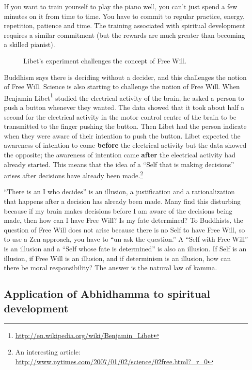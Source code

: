 If you want to train yourself to play the piano well, you can’t just spend a few minutes on it from time to time. You have to commit to regular practice, energy, repetition, patience and time. The training associated with spiritual development requires a similar commitment (but the rewards are much greater than becoming a skilled pianist).

\begin{figure}[H]
\centering

\caption{Libet’s experiment challenges the concept of Free Will.}
\label{fig:Libet}
\end{figure}

Buddhism says there is deciding without a decider, and this challenges the notion of Free Will. Science is also starting to challenge the notion of Free Will. When Benjamin Libet\footnote{\url{http://en.wikipedia.org/wiki/Benjamin_Libet}} studied the electrical activity of the brain, he asked a person to push a button whenever they wanted. The data showed that it took about half a second for the electrical activity in the motor control centre of the brain to be transmitted to the finger pushing the button. Then Libet had the person indicate when they were aware of their intention to push the button. Libet expected the awareness of intention to come \textbf{before} the electrical activity but the data showed the opposite; the awareness of intention came \textbf{after} the electrical activity had already started. This means that the idea of a “Self that is making decisions” arises after decisions have already been made.\footnote{An interesting article: \url{http://www.nytimes.com/2007/01/02/science/02free.html?_r=0}}

“There is an I who decides” is an illusion, a justification and a rationalization that happens after a decision has already been made. Many find this disturbing because if my brain makes decisions before I am aware of the decisions being made, then how can I have Free Will? Is my fate determined? To Buddhists, the question of Free Will does not arise because there is no Self to have Free Will, so to use a Zen approach, you have to “un-ask the question.” A “Self with Free Will” is an illusion and a “Self whose fate is determined” is also an illusion. If Self is an illusion, if Free Will is an illusion, and if determinism is an illusion, how can there be moral responsibility? The answer is the natural law of kamma.

\subsection*{Application of Abhidhamma to spiritual development}

